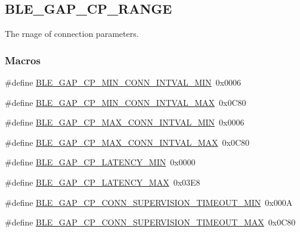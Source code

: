 \hypertarget{group___b_l_e___g_a_p___c_p___r_a_n_g_e}{}\subsection{B\+L\+E\+\_\+\+G\+A\+P\+\_\+\+C\+P\+\_\+\+R\+A\+N\+GE}
\label{group___b_l_e___g_a_p___c_p___r_a_n_g_e}


The rnage of connection parameters.  


\subsubsection*{Macros}
\begin{DoxyCompactItemize}
\item 
\#define \hyperlink{group___b_l_e___g_a_p___c_p___r_a_n_g_e_ga58d9dd4e77f0e9f8cc5b094aa56468ab}{B\+L\+E\+\_\+\+G\+A\+P\+\_\+\+C\+P\+\_\+\+M\+I\+N\+\_\+\+C\+O\+N\+N\+\_\+\+I\+N\+T\+V\+A\+L\+\_\+\+M\+IN}~0x0006
\item 
\#define \hyperlink{group___b_l_e___g_a_p___c_p___r_a_n_g_e_ga8834a099e12397b9c3b381c5a24d595a}{B\+L\+E\+\_\+\+G\+A\+P\+\_\+\+C\+P\+\_\+\+M\+I\+N\+\_\+\+C\+O\+N\+N\+\_\+\+I\+N\+T\+V\+A\+L\+\_\+\+M\+AX}~0x0\+C80
\item 
\#define \hyperlink{group___b_l_e___g_a_p___c_p___r_a_n_g_e_gab7df6362a0d63db4ad22b01472120eda}{B\+L\+E\+\_\+\+G\+A\+P\+\_\+\+C\+P\+\_\+\+M\+A\+X\+\_\+\+C\+O\+N\+N\+\_\+\+I\+N\+T\+V\+A\+L\+\_\+\+M\+IN}~0x0006
\item 
\#define \hyperlink{group___b_l_e___g_a_p___c_p___r_a_n_g_e_ga533e40a53fcaf4329ae7113e8e8801c4}{B\+L\+E\+\_\+\+G\+A\+P\+\_\+\+C\+P\+\_\+\+M\+A\+X\+\_\+\+C\+O\+N\+N\+\_\+\+I\+N\+T\+V\+A\+L\+\_\+\+M\+AX}~0x0\+C80
\item 
\#define \hyperlink{group___b_l_e___g_a_p___c_p___r_a_n_g_e_ga88254cca3db16af7b57a808c916196b2}{B\+L\+E\+\_\+\+G\+A\+P\+\_\+\+C\+P\+\_\+\+L\+A\+T\+E\+N\+C\+Y\+\_\+\+M\+IN}~0x0000
\item 
\#define \hyperlink{group___b_l_e___g_a_p___c_p___r_a_n_g_e_ga33bb13feebd5ab36d8f164f7ffd0af4c}{B\+L\+E\+\_\+\+G\+A\+P\+\_\+\+C\+P\+\_\+\+L\+A\+T\+E\+N\+C\+Y\+\_\+\+M\+AX}~0x03\+E8
\item 
\#define \hyperlink{group___b_l_e___g_a_p___c_p___r_a_n_g_e_ga47763a2c5916381298fd556b51601ef4}{B\+L\+E\+\_\+\+G\+A\+P\+\_\+\+C\+P\+\_\+\+C\+O\+N\+N\+\_\+\+S\+U\+P\+E\+R\+V\+I\+S\+I\+O\+N\+\_\+\+T\+I\+M\+E\+O\+U\+T\+\_\+\+M\+IN}~0x000A
\item 
\#define \hyperlink{group___b_l_e___g_a_p___c_p___r_a_n_g_e_ga71161c63ed5c4be17d4eb5364ce28747}{B\+L\+E\+\_\+\+G\+A\+P\+\_\+\+C\+P\+\_\+\+C\+O\+N\+N\+\_\+\+S\+U\+P\+E\+R\+V\+I\+S\+I\+O\+N\+\_\+\+T\+I\+M\+E\+O\+U\+T\+\_\+\+M\+AX}~0x0\+C80
\end{DoxyCompactItemize}


